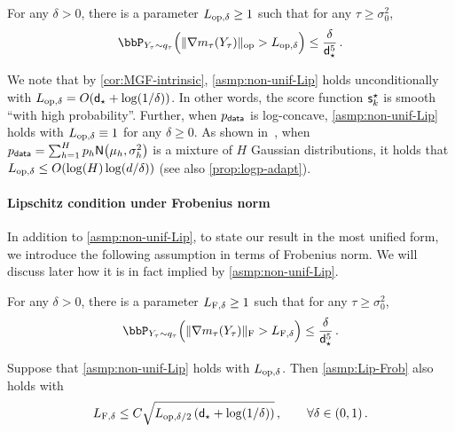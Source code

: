 \begin{assumption}\label{asmp:non-unif-Lip}
For any $\delta>0$, there is a parameter $\Lipop\geq 1$ such that for any $\tau\geq \sigma_0^2$,
\begin{align}
    \bbP_{Y_\tau\sim q_\tau}\prn[\Big]{ \nrmop{\nabla m_\tau(Y_\tau)}> \Lipop }\leq \frac{\delta}{\dstar^5}\,.
\end{align}
\end{assumption}

We note that by \cref{cor:MGF-intrinsic}, \cref{asmp:non-unif-Lip} holds unconditionally with $\Lipop=O(\dstar+\log(1/\delta))$. \fccomment{$\log \dstar\leq \dstar$} In other words, the score function $\scfs_k$ is smooth ``with high probability''. Further, when $\pdata$ is log-concave, \cref{asmp:non-unif-Lip} holds with $\Lipop\equiv 1$ for any $\delta\geq 0$. 
As shown in~\citet{jiao2025optimal}, when $\pdata=\sum_{h=1}^H p_h\normal{\mu_h,\sigma_h^2}$ is a mixture of $H$ Gaussian distributions, it holds that $\Lipop\leq O(\log(H)\log(d/\delta))$ (see also \cref{prop:logp-adapt}).


\paragraph{Lipschitz condition under Frobenius norm}
In addition to \cref{asmp:non-unif-Lip}, to state our result in the most unified form, we introduce the following assumption in terms of Frobenius norm. We will discuss later how it is in fact implied by \cref{asmp:non-unif-Lip}. 
\begin{assumption}\label{asmp:Lip-Frob}
For any $\delta>0$, there is a parameter $\LipF\geq 1$ such that for any $\tau\geq \sigma_0^2$,
\begin{align}
    \bbP_{Y_\tau\sim q_\tau}\prn[\Big]{ \nrmF{\nabla m_\tau(Y_\tau)}> \LipF }\leq \frac{\delta}{\dstar^5}\,.
\end{align}
\end{assumption}


\newcommand{\LF}{L_{\rm F}}
\newcommand{\Lop}{L_{\rm op}}

\begin{proposition}\label{prop:Lip-op-to-Frob}
Suppose that \cref{asmp:non-unif-Lip} holds with $\Lipop$. Then \cref{asmp:Lip-Frob} also holds with
\begin{align*}
    \LipF\leq C\sqrt{\Lipop[\delta/2]\,(\dstar+\log(1/\delta))}\,, \qquad \forall \delta\in(0,1)\,.
\end{align*}
\end{proposition}

